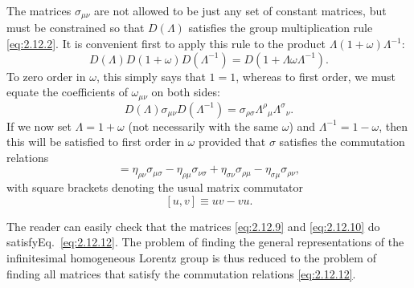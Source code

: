 The matrices \(\sigma_{\mu\nu}\) are not allowed to be just any set of
constant matrices, but must be constrained so that \(D(\Lambda)\) satisfies
the group multiplication rule \eqref{eq:2.12.2}. It is convenient first to
apply this rule to the product \(\Lambda(1+\omega)\Lambda^{-1}\):
\[
  D(\Lambda)D(1+\omega)D(\Lambda^{-1})
  =D(1+\Lambda\omega\Lambda^{-1}).
\]
To zero order in \(\omega\), this simply says that \(1=1\), whereas to first
order, we must equate the coefficients of \(\omega_{\mu\nu}\) on both sides:
\begin{equation}
  D(\Lambda)\sigma_{\mu\nu}D(\Lambda^{-1})
  =\sigma_{\rho\sigma}\Lambda^\rho{}_\mu\Lambda^\sigma{}_\nu .
  \tag{2.12.11}\label{eq:2.12.11}
\end{equation}
If we now set \(\Lambda=1+\omega\) (not necessarily with the same \(\omega\))
and \(\Lambda^{-1}=1-\omega\), then this will be satisfied to first order in
\(\omega\) provided that \(\sigma\) satisfies the commutation relations
\begin{equation}
  [\sigma_{\mu\nu},\sigma_{\rho\sigma}]
  =\eta_{\rho\nu}\sigma_{\mu\sigma}
   -\eta_{\rho\mu}\sigma_{\nu\sigma}
   +\eta_{\sigma\nu}\sigma_{\rho\mu}
   -\eta_{\sigma\mu}\sigma_{\rho\nu},
  \tag{2.12.12}\label{eq:2.12.12}
\end{equation}
with square brackets denoting the usual matrix commutator
\[
  [u,v]\equiv uv-vu .
\]

The reader can easily check that the matrices \eqref{eq:2.12.9} and
\eqref{eq:2.12.10} do satisfy\linebreak Eq.~\eqref{eq:2.12.12}. The problem of finding
the general representations of the infinitesimal homogeneous Lorentz group is
thus reduced to the problem of finding all matrices that satisfy the
commutation relations \eqref{eq:2.12.12}.

